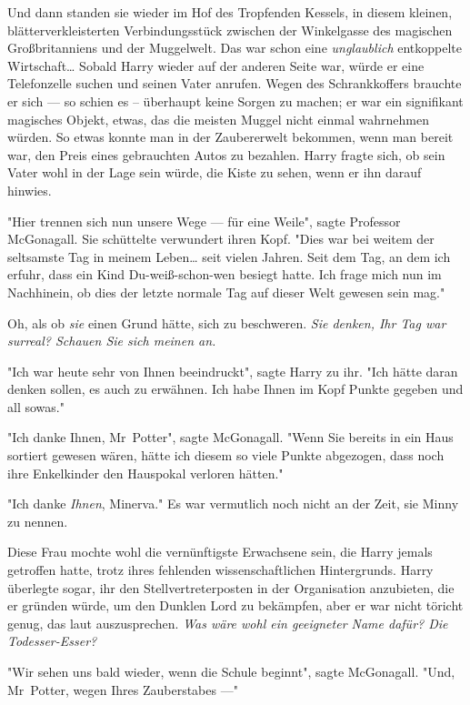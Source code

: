 {Und dann standen sie wieder im Hof des Tropfenden Kessels, in diesem kleinen, blätterverkleisterten Verbindungsstück zwischen der Winkelgasse des magischen Großbritanniens und der Muggelwelt. Das war schon eine \emph{unglaublich} entkoppelte Wirtschaft… Sobald Harry wieder auf der anderen Seite war, würde er eine Telefonzelle suchen und seinen Vater anrufen. Wegen des Schrankkoffers brauchte er sich --- so schien es -- überhaupt keine Sorgen zu machen; er war ein signifikant magisches Objekt, etwas, das die meisten Muggel nicht einmal wahrnehmen würden. So etwas konnte man in der Zaubererwelt bekommen, wenn man bereit war, den Preis eines gebrauchten Autos zu bezahlen. Harry fragte sich, ob sein Vater wohl in der Lage sein würde, die Kiste zu sehen, wenn er ihn darauf hinwies.

"Hier trennen sich nun unsere Wege --- für eine Weile", sagte Professor McGonagall. Sie schüttelte verwundert ihren Kopf. "Dies war bei weitem der seltsamste Tag in meinem Leben… seit vielen Jahren. Seit dem Tag, an dem ich erfuhr, dass ein Kind Du-weiß-schon-wen besiegt hatte. Ich frage mich nun im Nachhinein, ob dies der letzte normale Tag auf dieser Welt gewesen sein mag."

Oh, als ob \emph{sie} einen Grund hätte, sich zu beschweren. \emph{Sie denken, Ihr Tag war surreal? Schauen Sie sich meinen an.}

"Ich war heute sehr von Ihnen beeindruckt", sagte Harry zu ihr. "Ich hätte daran denken sollen, es auch zu erwähnen. Ich habe Ihnen im Kopf Punkte gegeben und all sowas."

"Ich danke Ihnen, Mr~Potter", sagte McGonagall. "Wenn Sie bereits in ein Haus sortiert gewesen wären, hätte ich diesem so viele Punkte abgezogen, dass noch ihre Enkelkinder den Hauspokal verloren hätten."

"Ich danke \emph{Ihnen}, Minerva." Es war vermutlich noch nicht an der Zeit, sie Minny zu nennen.

Diese Frau mochte wohl die vernünftigste Erwachsene sein, die Harry jemals getroffen hatte, trotz ihres fehlenden wissenschaftlichen Hintergrunds. Harry überlegte sogar, ihr den Stellvertreterposten in der Organisation anzubieten, die er gründen würde, um den Dunklen Lord zu bekämpfen, aber er war nicht töricht genug, das laut auszusprechen. \emph{Was wäre wohl ein geeigneter Name dafür? Die Todesser-Esser?}

"Wir sehen uns bald wieder, wenn die Schule beginnt", sagte McGonagall. "Und, Mr~Potter, wegen Ihres Zauberstabes ---"

}
